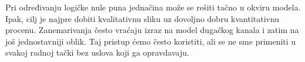 Pri određivanju logičke nule puna jednačina može se rešiti tačno u okviru modela. Ipak, cilj je najpre dobiti kvalitativnu sliku uz dovoljno dobru kvantitativnu procenu. Zanemarivanja često vraćaju izraz na model dugačkog kanala i zatim na još jednostavniji oblik. Taj pristup ćemo često koristiti, ali se ne sme primeniti u svakoj radnoj tački bez uslova koji ga opravdavaju.
